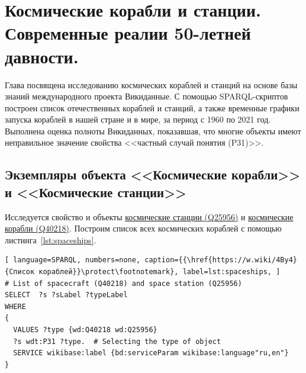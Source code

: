 
\chapter{Космические корабли и станции. Современные реалии 50-летней давности.}
\label{ch:spacecraft-space-station}

Глава посвящена исследованию космических кораблей и станций на основе базы знаний международного проекта Викиданные. С помощью SPARQL-скриптов построен список отечественных кораблей и станций, а также временные графики запуска кораблей в нашей стране и в мире, за период с 1960 по 2021 год. Выполнена оценка полноты Викиданных, показавшая, что многие объекты имеют неправильное значение свойства <<частный случай понятия (P31)>>.
\section{Экземпляры объекта <<Космические корабли>> и <<Космические станции>>}
Исследуется свойство  и объекты \href{https://www.wikidata.org/wiki/Q25956}{космические станции (Q25956)} и \href{https://www.wikidata.org/wiki/Q40218}{космические корабли (Q40218)}.
Построим список всех космических кораблей с помощью листинга~\ref{lst:spaceships}.


\begin{lstlisting}[ language=SPARQL, numbers=none, caption={{\href{https://w.wiki/4By4}{Список кораблей}}\protect\footnotemark}, label=lst:spaceships, ]
# List of spacecraft (Q40218) and space station (Q25956)
SELECT  ?s ?sLabel ?typeLabel
WHERE
{
  VALUES ?type {wd:Q40218 wd:Q25956}
  ?s wdt:P31 ?type.  # Selecting the type of object
  SERVICE wikibase:label {bd:serviceParam wikibase:language"ru,en"}
}
\end{lstlisting}
